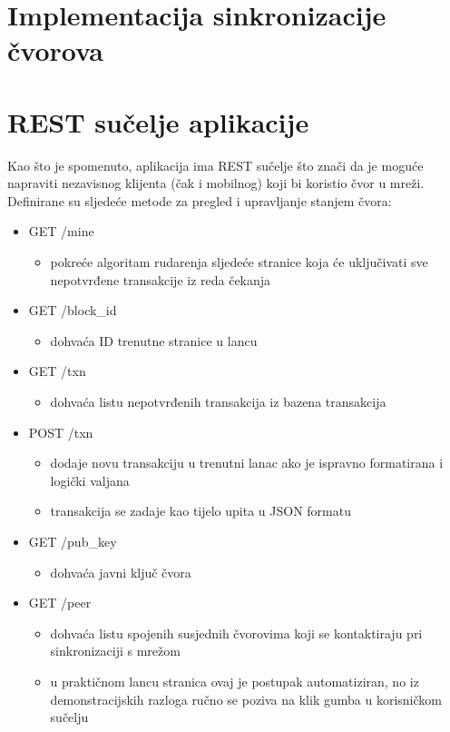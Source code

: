 \documentclass[utf8, zavrsni]{fer}
\begin{document}
\section{Implementacija sinkronizacije čvorova}

\section{REST sučelje aplikacije}
Kao što je spomenuto, aplikacija ima REST sučelje što znači da je moguće napraviti nezavisnog klijenta (čak i mobilnog) koji bi koristio čvor u mreži. Definirane su sljedeće metode za pregled i upravljanje stanjem čvora:

\begin{itemize}
	\item GET    /mine
	\begin{itemize}
		\item pokreće algoritam rudarenja sljedeće stranice koja će uključivati sve nepotvrđene transakcije iz reda čekanja
	\end{itemize}
	\item GET    /block\_id
	\begin{itemize}
		\item dohvaća ID trenutne stranice u lancu
	\end{itemize}
	\item GET    /txn
	\begin{itemize}
		\item dohvaća listu nepotvrđenih transakcija iz bazena transakcija
	\end{itemize}
	\item POST   /txn 
	\begin{itemize}
		\item dodaje novu transakciju u trenutni lanac ako je ispravno formatirana i logički valjana
		\item transakcija se zadaje kao tijelo upita u JSON formatu
	\end{itemize}
	\item GET    /pub\_key
	\begin{itemize}
		\item dohvaća javni ključ čvora
	\end{itemize}
	\item GET    /peer
	\begin{itemize}
		\item dohvaća listu spojenih susjednih čvorovima koji se kontaktiraju pri sinkronizaciji s mrežom
		\item u praktičnom lancu stranica ovaj je postupak automatiziran, no iz demonstracijskih razloga ručno se poziva na klik gumba u korisničkom sučelju

\end{itemize}
\end{itemize}
\end{document}
